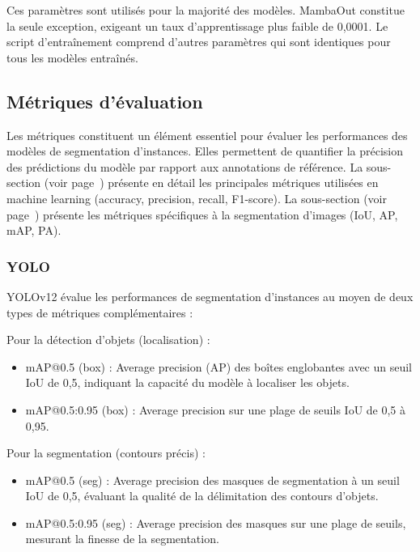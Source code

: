 Ces paramètres sont utilisés pour la majorité des modèles. MambaOut constitue la seule exception, exigeant un taux d'apprentissage plus faible de 0,0001. Le script d'entraînement comprend d'autres paramètres qui sont identiques pour tous les modèles entraînés.

\subsection{Métriques d'évaluation}
Les métriques constituent un élément essentiel pour évaluer les performances des modèles de segmentation d'instances. Elles permettent de quantifier la précision des prédictions du modèle par rapport aux annotations de référence. La sous-section \textit{} (voir page~\pageref{subsec:evaluation_performance_modele}) présente en détail les principales métriques utilisées en machine learning (accuracy, precision, recall, F1-score). La sous-section \textit{} (voir page~\pageref{subsec:evaluation_des_performances}) présente les métriques spécifiques à la segmentation d'images (IoU, AP, mAP, PA).

\subsubsection{YOLO}
YOLOv12 évalue les performances de segmentation d'instances au moyen de deux types de métriques complémentaires :

Pour la détection d'objets (localisation) :
\begin{itemize}
    \item mAP@0.5 (box) : Average precision (AP) des boîtes englobantes avec un seuil IoU de 0,5, indiquant la capacité du modèle à localiser les objets.
    \item mAP@0.5:0.95 (box) : Average precision sur une plage de seuils IoU de 0,5 à 0,95.
\end{itemize}

Pour la segmentation (contours précis) :
\begin{itemize}
    \item mAP@0.5 (seg) : Average precision des masques de segmentation à un seuil IoU de 0,5, évaluant la qualité de la délimitation des contours d'objets.
    \item mAP@0.5:0.95 (seg) : Average precision des masques sur une plage de seuils, mesurant la finesse de la segmentation.
\end{itemize}

